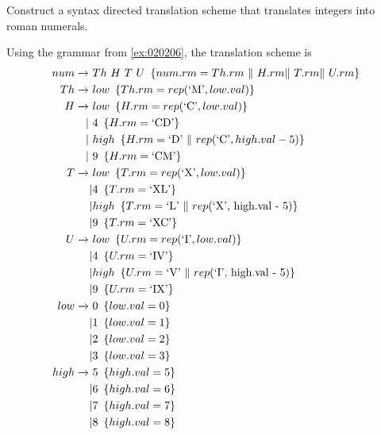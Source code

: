 \begin{exercise}\label{ex:020303}
    Construct a syntax directed translation scheme that translates integers 
    into roman numerals.
\end{exercise}
\begin{solution}\label{sol:020303}
    Using the grammar from \cref{ex:020206}, the translation scheme is
    \begin{align*}
        num \yld\ &Th\ H\ T\ U\ \cbrak{num.rm = Th.rm\ \|\ H.rm \|\ T.rm \|\ U.rm} \\
        Th \yld\ &low\ \cbrak{Th.rm = rep(\textrm{`M'}, low.val)} \\
        H \yld\ &low\ \cbrak{H.rm = rep(\textrm{`C'}, low.val)} \\
              |\ &4\ \cbrak{H.rm = \textrm{`CD'}} \\
              |\ &high\ \cbrak{H.rm = \textrm{`D'}\ \|\ rep(\textrm{`C'}, high.val - 5)} \\
              |\ &9\ \cbrak{H.rm = \textrm{`CM'}} \\
        T \yld\ &low\ \cbrak{T.rm = rep(\textrm{`X'}, low.val)} \\
              | &4\ \cbrak{T.rm = \textrm{`XL'}} \\
              | &high\ \cbrak{T.rm = \textrm{`L'}\ \|\ rep(\textrm{`X', high.val - 5})} \\
              | &9\ \cbrak{T.rm = \textrm{`XC'}} \\
        U \yld\ &low\ \cbrak{U.rm = rep(\textrm{`I'}, low.val)} \\
              | &4\ \cbrak{U.rm = \textrm{`IV'}} \\
              | &high\ \cbrak{U.rm = \textrm{`V'}\ \|\ rep(\textrm{`I', high.val - 5})} \\
              | &9\ \cbrak{U.rm = \textrm{`IX'}} \\
        low \yld\ &0\ \cbrak{low.val = 0} \\
                | &1\ \cbrak{low.val = 1} \\
                | &2\ \cbrak{low.val = 2} \\
                | &3\ \cbrak{low.val = 3} \\
        high \yld\ &5\ \cbrak{high.val = 5} \\
                | &6\ \cbrak{high.val = 6} \\
                | &7\ \cbrak{high.val = 7} \\
                | &8\ \cbrak{high.val = 8}
    \end{align*}
\end{solution}
